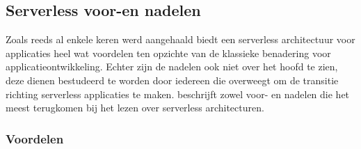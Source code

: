 \subsection{Serverless voor-en nadelen}
Zoals reeds al enkele keren werd aangehaald biedt een serverless architectuur voor applicaties heel wat voordelen ten opzichte van de klassieke benadering voor applicatieontwikkeling. Echter zijn de nadelen ook niet over het hoofd te zien, deze dienen bestudeerd te worden door iedereen die overweegt om de transitie richting serverless applicaties te maken. \textcite{Stigler2017} beschrijft zowel voor- en nadelen die het meest terugkomen bij het lezen over serverless architecturen.

\subsubsection{Voordelen}

